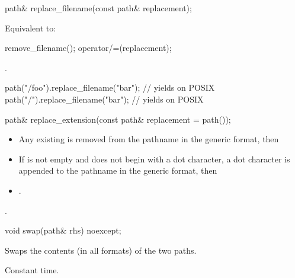 %
\begin{itemdecl}
path& replace_filename(const path& replacement);
\end{itemdecl}

\begin{itemdescr}
\pnum
\effects
Equivalent to:
\begin{codeblock}
remove_filename();
operator/=(replacement);
\end{codeblock}

\pnum
\returns
{}.

\pnum
\begin{example}
\begin{codeblock}
path("/foo").replace_filename("bar");   // yields  on POSIX
path("/").replace_filename("bar");      // yields  on POSIX
\end{codeblock}
\end{example}
\end{itemdescr}

%
\begin{itemdecl}
path& replace_extension(const path& replacement = path());
\end{itemdecl}

\begin{itemdescr}
\pnum
\effects
  \begin{itemize}
\item Any existing  is removed from the
    pathname in the generic format,
    then
\item If  is not empty and does not begin with a dot
    character, a dot character is appended to the pathname in the generic format, then
\item
  .
  \end{itemize}

\pnum
\returns
{}.
\end{itemdescr}

%
\begin{itemdecl}
void swap(path& rhs) noexcept;
\end{itemdecl}

\begin{itemdescr}
\pnum
\effects
Swaps the contents (in all formats) of the two paths.

\pnum
\complexity
Constant time.
\end{itemdescr}

